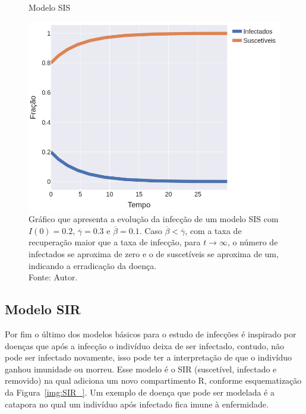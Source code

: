 \begin{figure}[H]
  \centering
  \captionsetup{font=normalsize,skip=1pt,singlelinecheck=on,labelsep=endash}
  \caption{Modelo SIS}
  \includegraphics[scale=0.4]{figuras/SIS_2.png}
  \captionsetup{font=small,position=below,skip=-1pt}
   \caption*{Gráfico que apresenta a evolução da infecção de um modelo SIS com $I(0) = 0.2$, $\overline{\gamma} = 0.3$ e $\overline{\beta} = 0.1$. Caso $\overline{\beta} < \overline{\gamma}$, com a taxa de recuperação maior que a taxa de infecção, para $t \rightarrow \infty$, o número de infectados se aproxima de zero e o de suscetíveis se aproxima de um, indicando a erradicação da doença.\\Fonte: Autor.}
   \label{SIS_2}
\end{figure}

\subsection{Modelo SIR}


Por fim o último dos modelos básicos para o estudo de infecções é inspirado por doenças que após a infecção o indivíduo deixa de ser infectado, contudo, não pode ser infectado novamente, isso pode ter a interpretação de que o indivíduo ganhou imunidade ou morreu.
Esse
modelo é o SIR (suscetível, infectado e removido) na qual adiciona um novo compartimento R, conforme esquematização da Figura~\ref{img:SIR_}. Um exemplo de doença que pode ser modelada é a catapora no qual um indivíduo após infectado fica imune à enfermidade.

